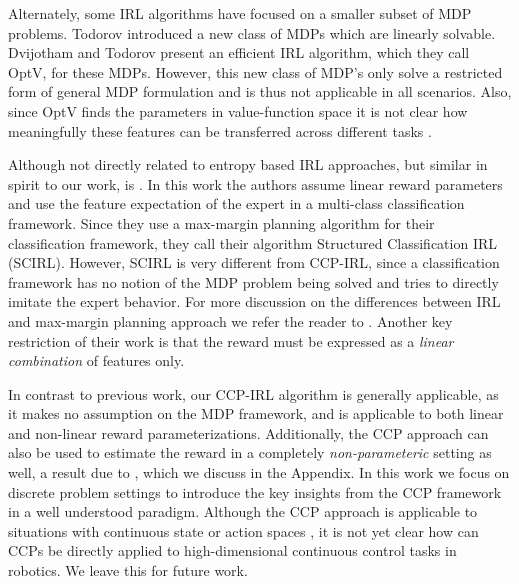 \documentclass{article}
\begin{document}
Alternately, some IRL algorithms have focused on a smaller subset of MDP problems. Todorov  introduced a new class of MDPs which are linearly solvable. Dvijotham and Todorov  present an efficient IRL algorithm, which they call OptV, for these MDPs. However, this new class of MDP's only solve a restricted form of general MDP formulation and is thus not applicable in all scenarios. 
Also, since OptV finds the parameters in value-function space it is not clear how meaningfully these features can be transferred across different tasks \cite{levine2012continuous}.

Although not directly related to entropy based IRL approaches, but similar in spirit to our work, is \cite{klein2012inverse}. In this work the authors assume linear reward parameters and use the feature expectation of the expert in a multi-class classification framework. Since they use a max-margin planning algorithm for their classification framework, they call their algorithm Structured Classification IRL (SCIRL). However, SCIRL is very different from CCP-IRL, since a classification framework has no notion of the MDP problem being solved and tries to directly imitate the expert behavior. For more discussion on the differences between IRL and max-margin planning approach we refer the reader to \cite{Ratliff2006, ziebart2010modeling}. Another key restriction of their work is that the reward must be expressed as a \textit{linear combination} of features only.


In contrast to previous work, our CCP-IRL algorithm is generally applicable, as it makes no assumption on the MDP framework, and is applicable to both linear and non-linear reward parameterizations. Additionally, the CCP approach can also be used to estimate the reward in a completely \textit{non-parameteric} setting as well, a result due to \cite{magnac}, which we discuss in the Appendix.
In this work we focus on discrete problem settings to introduce the key insights from the CCP framework in a well understood paradigm. Although the CCP approach is applicable to situations with continuous state or action spaces \cite{altuug1998effect}, it is not yet clear how can CCPs be directly applied to high-dimensional continuous control tasks in robotics. We leave this for future work.
\end{document}
